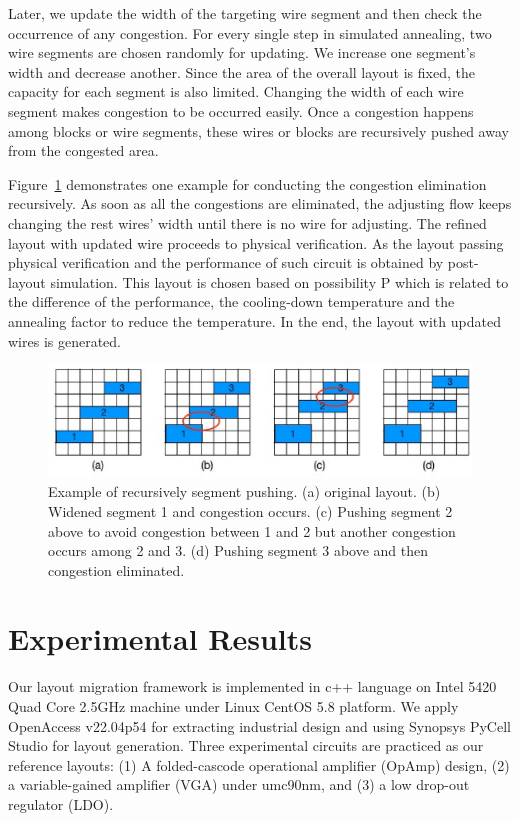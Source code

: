     Later, we update the width of the targeting wire segment and then check the occurrence of any congestion. For every single step in simulated annealing, two wire segments are chosen randomly for updating. We increase one segment's width and decrease another. Since the area of the overall layout is fixed, the capacity for each segment is also limited. Changing the width of each wire segment makes congestion to be occurred easily. Once a congestion happens among blocks or wire segments, these wires or blocks are recursively pushed away from the congested area.

    Figure~\ref{fig:Congestion} demonstrates one example for conducting the congestion elimination recursively. As soon as all the congestions are eliminated, the adjusting flow keeps changing the rest wires' width until there is no wire for adjusting. The refined layout with updated wire proceeds to physical verification. As the layout passing physical verification and the performance of such circuit is obtained by post-layout simulation. This layout is chosen based on possibility P which is related to the difference of the performance, the cooling-down temperature and the annealing factor to reduce the temperature. In the end, the layout with updated wires is generated.
    \begin{figure}[t]
      \centering
      \centerline{\includegraphics[width=\textwidth]{Fig/Chapter4/Congestion.eps}}
      \caption{Example of recursively segment pushing. (a) original layout. (b) Widened segment 1 and congestion occurs. (c) Pushing segment 2 above to avoid congestion between 1 and 2 but another congestion occurs among 2 and 3. (d) Pushing segment 3 above and then congestion eliminated.} 
      \label{fig:Congestion}
    \end{figure}


  \section{Experimental Results}\label{sec:RLPADMExp}

    Our layout migration framework is implemented in c++ language on Intel 5420 Quad Core 2.5GHz machine under Linux CentOS 5.8 platform. We apply OpenAccess v22.04p54 for extracting industrial design and using Synopsys PyCell Studio for layout generation. Three experimental circuits are practiced as our reference layouts: (1) A folded-cascode operational amplifier (OpAmp) design, (2) a variable-gained amplifier (VGA) under umc90nm, and (3) a low drop-out regulator (LDO). 

